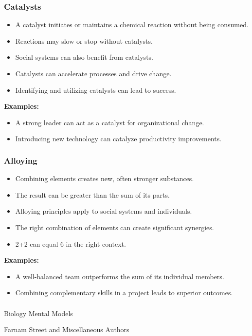 \begin{frame}[fragile]\frametitle{Catalysts}
\begin{itemize}
    \item A catalyst initiates or maintains a chemical reaction without being consumed.
    \item Reactions may slow or stop without catalysts.
    \item Social systems can also benefit from catalysts.
    \item Catalysts can accelerate processes and drive change.
    \item Identifying and utilizing catalysts can lead to success.
\end{itemize}
\textbf{Examples:}
\begin{itemize}
    \item A strong leader can act as a catalyst for organizational change.
    \item Introducing new technology can catalyze productivity improvements.
\end{itemize}
\end{frame}

\begin{frame}[fragile]\frametitle{Alloying}
\begin{itemize}
    \item Combining elements creates new, often stronger substances.
    \item The result can be greater than the sum of its parts.
    \item Alloying principles apply to social systems and individuals.
    \item The right combination of elements can create significant synergies.
    \item 2+2 can equal 6 in the right context.
\end{itemize}
\textbf{Examples:}
\begin{itemize}
    \item A well-balanced team outperforms the sum of its individual members.
    \item Combining complementary skills in a project leads to superior outcomes.
\end{itemize}
\end{frame}

\begin{frame}[fragile]\frametitle{}
\begin{center}
{\Large Biology Mental Models}

{\tiny Farnam Street and Miscellaneous Authors }


\end{center}
\end{frame}


